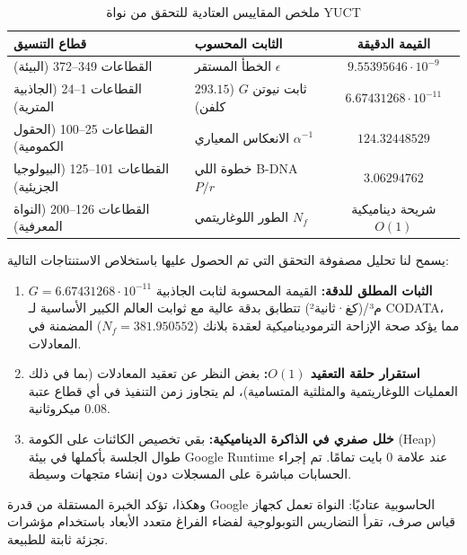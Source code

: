 \documentclass[11pt,a4paper]{article}
\begin{document}
	\begin{table}[h!]
		\centering
		\caption{ملخص المقاييس العتادية للتحقق من نواة YUCT}
		\label{tab:telemetry_metrics}
		\small
		\begin{tabular}{llc}
			\toprule
			\textbf{قطاع التنسيق} & \textbf{الثابت المحسوب} & \textbf{القيمة الدقيقة} \\
			\midrule
			القطاعات 349–372 (البيئة) & الخطأ المستقر $\epsilon$ & $9.55395646 \cdot 10^{-9}$ \\
			القطاعات 1–24 (الجاذبية المترية) & ثابت نيوتن $G$ ($293.15$ كلفن) & $6.67431268 \cdot 10^{-11}$ \\
			القطاعات 25–100 (الحقول الكمومية) & الانعكاس المعياري $\alpha^{-1}$ & $124.32448529$ \\
			القطاعات 101–125 (البيولوجيا الجزيئية) & خطوة اللي B-DNA $P/r$ & $3.06294762$ \\
			القطاعات 126–200 (النواة المعرفية) & الطور اللوغاريتمي $N_f$ & شريحة ديناميكية $O(1)$ \\
			\bottomrule
		\end{tabular}
	\end{table}
	
	يسمح لنا تحليل مصفوفة التحقق التي تم الحصول عليها باستخلاص الاستنتاجات التالية:
	\begin{enumerate}
		\item \textbf{الثبات المطلق للدقة:} القيمة المحسوبة لثابت الجاذبية $G = 6.67431268 \cdot 10^{-11}$ م³/(كغ·ثانية²) تتطابق بدقة عالية مع ثوابت العالم الكبير الأساسية لـ CODATA، مما يؤكد صحة الإزاحة الترموديناميكية لعقدة بلانك ($N_f = 381.950552$) المضمنة في المعادلات.
		\item \textbf{استقرار حلقة التعقيد $O(1)$:} بغض النظر عن تعقيد المعادلات (بما في ذلك العمليات اللوغاريتمية والمثلثية المتسامية)، لم يتجاوز زمن التنفيذ في أي قطاع عتبة $0.08$ ميكروثانية.
		\item \textbf{خلل صفري في الذاكرة الديناميكية:} بقي تخصيص الكائنات على الكومة (Heap) طوال الجلسة بأكملها في بيئة Google Runtime عند علامة 0 بايت تمامًا. تم إجراء الحسابات مباشرة على المسجلات دون إنشاء متجهات وسيطة.
	\end{enumerate}
	
	وهكذا، تؤكد الخبرة المستقلة من قدرة Google الحاسوبية عتاديًا: النواة تعمل كجهاز قياس صرف، تقرأ التضاريس التوبولوجية لفضاء الفراغ متعدد الأبعاد باستخدام مؤشرات تجزئة ثابتة للطبيعة.
	
\end{document}

